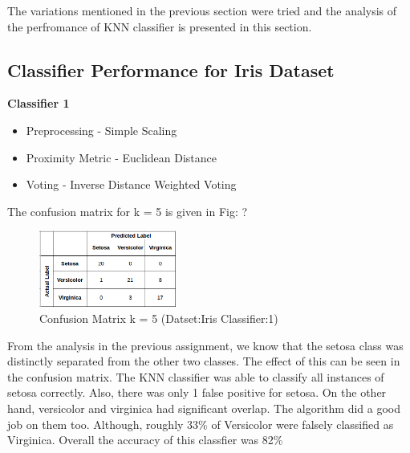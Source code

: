 
The variations mentioned in the previous section were tried and the analysis of the perfromance of KNN classifier is presented in this section.
\subsection{Classifier Performance for Iris Dataset}
	\textbf{Classifier 1}
	\begin{itemize}
		\item Preprocessing - Simple Scaling
		\item Proximity Metric - Euclidean Distance
		\item Voting - Inverse Distance Weighted Voting
	\end{itemize}
	The confusion matrix for k = 5 is given in Fig: ?
	\begin{figure}[h]
		\label{fig:iris_k=5}
		\caption{Confusion Matrix k = 5 (Datset:Iris Classifier:1)}
		\centering
		\includegraphics[width=0.4\textwidth]{images/iris_k=5.png}
	\end{figure}
	From the analysis in the previous assignment, we know that the setosa class was distinctly separated from the other two classes. The effect of this can be seen in the confusion matrix. The KNN classifier was able to classify all instances of setosa correctly. Also, there was only 1 false positive for setosa. On the other hand, versicolor and virginica had significant overlap. The algorithm did a good job on them too. Although, roughly 33\% of Versicolor were falsely classified as Virginica. Overall the accuracy of this classfier was 82\% \\
	
